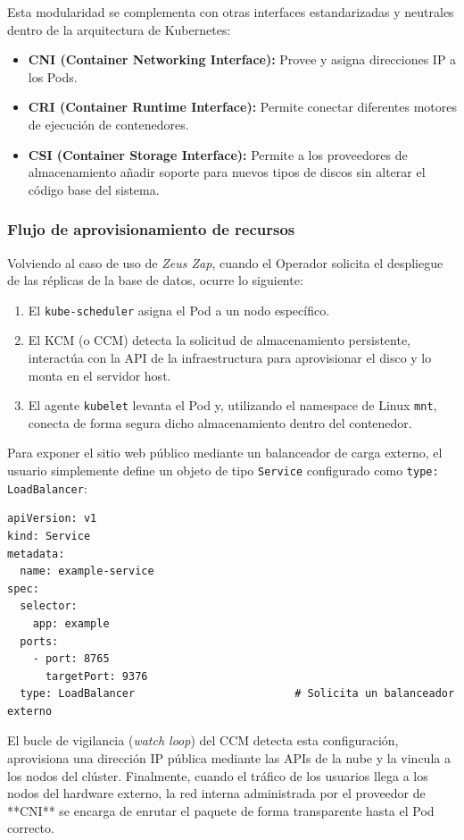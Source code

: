 Esta modularidad se complementa con otras interfaces estandarizadas y neutrales dentro de la arquitectura de Kubernetes:
\begin{itemize}
    \item \textbf{CNI (Container Networking Interface):} Provee y asigna direcciones IP a los Pods.
    \item \textbf{CRI (Container Runtime Interface):} Permite conectar diferentes motores de ejecución de contenedores.
    \item \textbf{CSI (Container Storage Interface):} Permite a los proveedores de almacenamiento añadir soporte para nuevos tipos de discos sin alterar el código base del sistema.
\end{itemize}

\subsubsection{Flujo de aprovisionamiento de recursos}
Volviendo al caso de uso de \textit{Zeus Zap}, cuando el Operador solicita el despliegue de las réplicas de la base de datos, ocurre lo siguiente:
\begin{enumerate}
    \item El \texttt{kube-scheduler} asigna el Pod a un nodo específico.
    \item El KCM (o CCM) detecta la solicitud de almacenamiento persistente, interactúa con la API de la infraestructura para aprovisionar el disco y lo monta en el servidor host.
    \item El agente \texttt{kubelet} levanta el Pod y, utilizando el namespace de Linux \texttt{mnt}, conecta de forma segura dicho almacenamiento dentro del contenedor.
\end{enumerate}

Para exponer el sitio web público mediante un balanceador de carga externo, el usuario simplemente define un objeto de tipo \texttt{Service} configurado como \texttt{type: LoadBalancer}:

\begin{verbatim}
apiVersion: v1
kind: Service
metadata:
  name: example-service
spec:
  selector:
    app: example
  ports:
    - port: 8765
      targetPort: 9376
  type: LoadBalancer                         # Solicita un balanceador externo
\end{verbatim}

El bucle de vigilancia (\textit{watch loop}) del CCM detecta esta configuración, aprovisiona una dirección IP pública mediante las APIs de la nube y la vincula a los nodos del clúster. Finalmente, cuando el tráfico de los usuarios llega a los nodos del hardware externo, la red interna administrada por el proveedor de **CNI** se encarga de enrutar el paquete de forma transparente hasta el Pod correcto.


